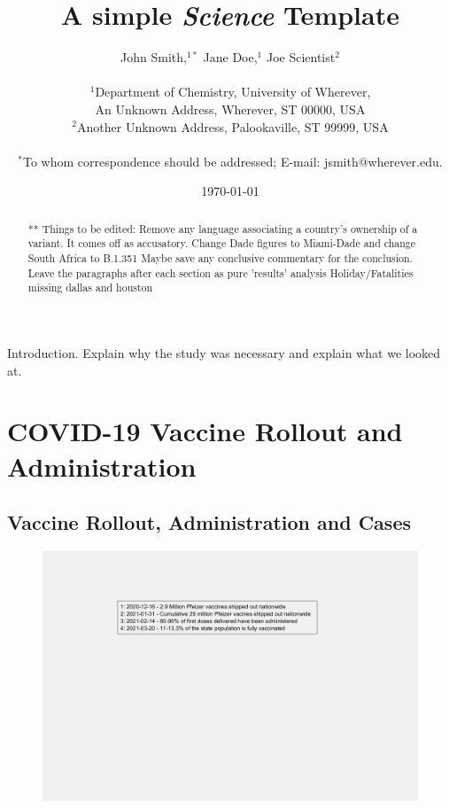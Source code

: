 \documentclass[]{article}
\title{A simple {\it Science\/} Template}
\author
{John Smith,$^{1\ast}$ Jane Doe,$^{1}$ Joe Scientist$^{2}$\\
	\\
	\normalsize{$^{1}$Department of Chemistry, University of Wherever,}\\
	\normalsize{An Unknown Address, Wherever, ST 00000, USA}\\
	\normalsize{$^{2}$Another Unknown Address, Palookaville, ST 99999, USA}\\
	\\
	\normalsize{$^\ast$To whom correspondence should be addressed; E-mail:  jsmith@wherever.edu.}
}
\date{\today}
\begin{document}
	
\baselineskip24pt

\maketitle

\begin{abstract}
 ** Things to be edited:
 Remove any language associating a country's ownership of a variant. It comes off as accusatory. 
 Change Dade figures to Miami-Dade and change South Africa to B.1.351
  Maybe save any conclusive commentary for the conclusion. Leave the paragraphs after each section as pure 'results' analysis
  Holiday/Fatalities missing dallas and houston
 
\end{abstract}

\indent Introduction. Explain why the study was necessary and explain what we looked at. 



\section{COVID-19 Vaccine Rollout and Administration}


\subsection{Vaccine Rollout, Administration and Cases}

\begin{figure}[!h]
	\includegraphics[width=\linewidth]{legends/vaccine_rollout_legend.png}
	\caption{}
	\label{fig:legends/vaccine_rollout_legendLabel}
\end{figure}
\end{document}
